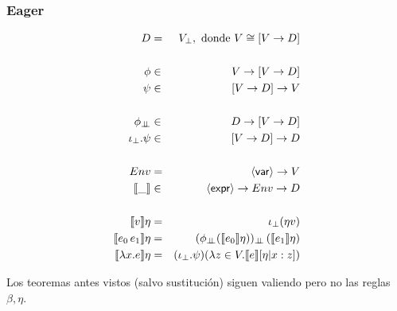     \subsubsection{Eager}
      \begin{eqnarray*}
        D &=& V_\bot, \text{ donde } V \cong [V \to D] \\ \\
        \phi &\in& V \to [V \to D] \\
        \psi &\in& [V \to D] \to V \\ \\
        \phi_{\botbot} &\in& D \to [V \to D] \\
        \iota_\bot . \psi &\in& [V \to D] \to D \\ \\
        Env &=& \var \to V \\
        \llbracket\_\rrbracket &\in& \expr \to Env \to D \\ \\
        \llbracket v\rrbracket\eta &=& \iota_\bot (\eta v) \\
        \llbracket e_0\, e_1\rrbracket\eta &=& (\phi_{\botbot} (\llbracket e_0\rrbracket\eta))_{\botbot}\, (\llbracket e_1\rrbracket\eta)\\
        \llbracket\lambda x.e\rrbracket\eta &=& (\iota_\bot . \psi)(\lambda z \in V. \llbracket e\rrbracket[\eta|x:z])
      \end{eqnarray*}

      \PN Los teoremas antes vistos (salvo sustitución) siguen valiendo pero no las reglas $\beta, \eta$.
        
